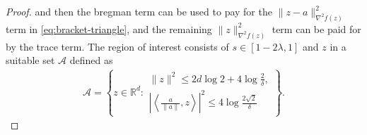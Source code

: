 \documentclass{article}
\theoremstyle{plain}
\theoremstyle{definition}
\theoremstyle{plain}
\newcommand{\R}{\mathbb R}
\begin{document}
\begin{proof}
    and then the bregman term can be used to pay for the $\|z - a\|_{\nabla^2f(z)}^2$ term in \eqref{eq:bracket-triangle},
    and the remaining $\|z\|_{\nabla^2f(z)}^2$ term can be paid for by the trace term.
    The region of interest consists of $s\in[1-2\lambda,1]$ and $z$ in a suitable set $\mathcal A$ defined as
    \begin{align}
        \mathcal A
        =
        \left\{
        z\in\R^d:
        \begin{array}{l}
            \displaystyle
            \|z\|^2
            \leq
            2d\log 2+4\log\frac{2}{\delta},
            \\[0.2cm]
            \displaystyle
            \left|
            \left\langle\frac{a}{\|a\|},z\right\rangle
            \right|^2
            \leq
            4\log\frac{2\sqrt{2}}{\delta}
        \end{array}
        \right\}.
        \label{eq:bracket-set}
    \end{align}


\end{proof}
\end{document}
